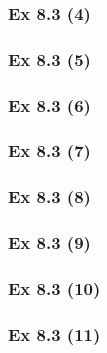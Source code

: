 \subsubsection{Ex 8.3 (4)}\label{sec:Ex_8.3.4}

\subsubsection{Ex 8.3 (5)}\label{sec:Ex_8.3.5}

\subsubsection{Ex 8.3 (6)}\label{sec:Ex_8.3.6}

\subsubsection{Ex 8.3 (7)}\label{sec:Ex_8.3.7}

\subsubsection{Ex 8.3 (8)}\label{sec:Ex_8.3.8}

\subsubsection{Ex 8.3 (9)}\label{sec:Ex_8.3.9}

\subsubsection{Ex 8.3 (10)}\label{sec:Ex_8.3.10}

\subsubsection{Ex 8.3 (11)}\label{sec:Ex_8.3.11}

